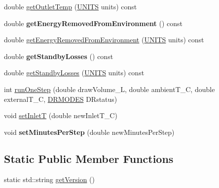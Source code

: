 \begin{DoxyCompactItemize}
\item 
double \hyperlink{class_h_p_w_h_a0b75a215e395f52d60997f9b07d37de7}{get\-Outlet\-Temp} (\hyperlink{class_h_p_w_h_a145320dbf116b9245ac4421026cff294}{U\-N\-I\-T\-S} units) const 
\item 
\hypertarget{class_h_p_w_h_a4ee36fec9eb6e1294ad200aeca2da87f}{double {\bfseries get\-Energy\-Removed\-From\-Environment} () const }\label{class_h_p_w_h_a4ee36fec9eb6e1294ad200aeca2da87f}

\item 
double \hyperlink{class_h_p_w_h_af58e48e9103fbb5525a251744816cc77}{get\-Energy\-Removed\-From\-Environment} (\hyperlink{class_h_p_w_h_a145320dbf116b9245ac4421026cff294}{U\-N\-I\-T\-S} units) const 
\item 
\hypertarget{class_h_p_w_h_ae615d088a390d0e1db95a196406ba2b4}{double {\bfseries get\-Standby\-Losses} () const }\label{class_h_p_w_h_ae615d088a390d0e1db95a196406ba2b4}

\item 
double \hyperlink{class_h_p_w_h_a5cccd4667bf976b0a6c1d33ce5fec880}{get\-Standby\-Losses} (\hyperlink{class_h_p_w_h_a145320dbf116b9245ac4421026cff294}{U\-N\-I\-T\-S} units) const 
\item 
int \hyperlink{class_h_p_w_h_a68a687d987105c10a17bac1a94be5224}{run\-One\-Step} (double draw\-Volume\-\_\-\-L, double ambient\-T\-\_\-\-C, double external\-T\-\_\-\-C, \hyperlink{class_h_p_w_h_a6a74814715ed6a33a75fd0d9dc3e7107}{D\-R\-M\-O\-D\-E\-S} D\-Rstatus)
\item 
void \hyperlink{class_h_p_w_h_a5df4fd4422ba54080f519aaf6375be32}{set\-Inlet\-T} (double new\-Inlet\-T\-\_\-\-C)
\item 
\hypertarget{class_h_p_w_h_a5752aa0b3488189c7321c174887f1c31}{void {\bfseries set\-Minutes\-Per\-Step} (double new\-Minutes\-Per\-Step)}\label{class_h_p_w_h_a5752aa0b3488189c7321c174887f1c31}

\end{DoxyCompactItemize}
\subsection*{Static Public Member Functions}
\begin{DoxyCompactItemize}
\item 
static std\-::string \hyperlink{class_h_p_w_h_a001c10815863cb3efdb721d364111275}{get\-Version} ()
\end{DoxyCompactItemize}
